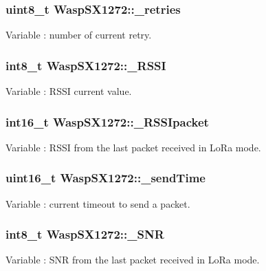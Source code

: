 \subsubsection[{\texorpdfstring{\+\_\+retries}{_retries}}]{\setlength{\rightskip}{0pt plus 5cm}uint8\+\_\+t Wasp\+S\+X1272\+::\+\_\+retries}\hypertarget{class_wasp_s_x1272_a446b8d3764d930f490508e03d603f28a}{}\label{class_wasp_s_x1272_a446b8d3764d930f490508e03d603f28a}
Variable \+: number of current retry. 
\subsubsection[{\texorpdfstring{\+\_\+\+R\+S\+SI}{_RSSI}}]{\setlength{\rightskip}{0pt plus 5cm}int8\+\_\+t Wasp\+S\+X1272\+::\+\_\+\+R\+S\+SI}\hypertarget{class_wasp_s_x1272_a33d5c32f89a846f1d9a6766080a0ded1}{}\label{class_wasp_s_x1272_a33d5c32f89a846f1d9a6766080a0ded1}
Variable \+: R\+S\+SI current value. 
\subsubsection[{\texorpdfstring{\+\_\+\+R\+S\+S\+Ipacket}{_RSSIpacket}}]{\setlength{\rightskip}{0pt plus 5cm}int16\+\_\+t Wasp\+S\+X1272\+::\+\_\+\+R\+S\+S\+Ipacket}\hypertarget{class_wasp_s_x1272_a38392b43de9313fe7527421ba79ca475}{}\label{class_wasp_s_x1272_a38392b43de9313fe7527421ba79ca475}
Variable \+: R\+S\+SI from the last packet received in Lo\+Ra mode. 
\subsubsection[{\texorpdfstring{\+\_\+send\+Time}{_sendTime}}]{\setlength{\rightskip}{0pt plus 5cm}uint16\+\_\+t Wasp\+S\+X1272\+::\+\_\+send\+Time}\hypertarget{class_wasp_s_x1272_a5074331b975a265eeae0235edd6da59d}{}\label{class_wasp_s_x1272_a5074331b975a265eeae0235edd6da59d}
Variable \+: current timeout to send a packet. 
\subsubsection[{\texorpdfstring{\+\_\+\+S\+NR}{_SNR}}]{\setlength{\rightskip}{0pt plus 5cm}int8\+\_\+t Wasp\+S\+X1272\+::\+\_\+\+S\+NR}\hypertarget{class_wasp_s_x1272_ab2738b8b388733f5e25a777fee3bacdc}{}\label{class_wasp_s_x1272_ab2738b8b388733f5e25a777fee3bacdc}
Variable \+: S\+NR from the last packet received in Lo\+Ra mode. 

